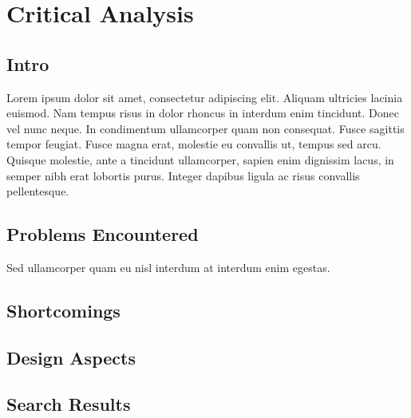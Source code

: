 
\pagestyle{fancy}

\chapter{Critical Analysis}
\label{Analysis}


\section{Intro}

Lorem ipsum dolor sit amet, consectetur adipiscing elit. Aliquam ultricies lacinia euismod. Nam tempus risus in dolor rhoncus in interdum enim tincidunt. Donec vel nunc neque. In condimentum ullamcorper quam non consequat. Fusce sagittis tempor feugiat. Fusce magna erat, molestie eu convallis ut, tempus sed arcu. Quisque molestie, ante a tincidunt ullamcorper, sapien enim dignissim lacus, in semper nibh erat lobortis purus. Integer dapibus ligula ac risus convallis pellentesque.


\section{Problems Encountered}

Sed ullamcorper quam eu nisl interdum at interdum enim egestas.


\section{Shortcomings}


\section{Design Aspects}


\section{Search Results}
